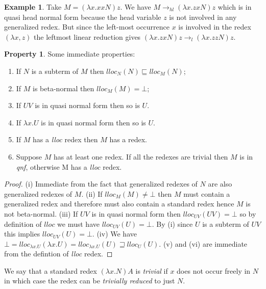 \documentclass{article}
\theoremstyle{definition}
\newtheorem{property}{Property}[section]
\newtheorem{example}{Example}[section]
\begin{document}
\begin{example}
Take $M = (\lambda x. x x N) z$. We have $M \rightarrow_{hl} (\lambda x. z x N) z$ which is in quasi head normal form because the head variable $z$ is not involved in any generalized redex.
But since the left-most occurrence $x$ is involved in the redex $(\lambda x, z)$ the leftmost linear reduction gives $(\lambda x. z x N) z \rightarrow_l (\lambda x. z z N) z$.
\end{example}

\begin{property}
\label{prop:lloc_properties}
Some immediate properties:
\begin{enumerate}[label=(\roman*)]
\item
 If $N$ is a subterm of $M$ then $lloc_N(N) \sqsubseteq lloc_M(N)$;
\item
 If $M$ is beta-normal then $lloc_M(M) = \bot$;
 \item
 If $U V$ is in quasi normal form then so is $U$.
\item
 If $\lambda x . U$ is in quasi normal form then so is $U$.
 \item If $M$ has a \emph{lloc} redex then $M$ has a redex.
 \item Suppose $M$ has at least one redex.
 If all the redexes are trivial then $M$ is in \emph{qnf}, otherwise M has a \emph{lloc} redex.
\end{enumerate}
\end{property}
\begin{proof}
(i) Immediate from the fact that generalized redexes of $N$ are also generalized redexes of $M$. (ii) If $lloc_M(M) \neq \bot$ then $M$ must contain a generalized redex and therefore must also contain a standard redex hence $M$ is not beta-normal.
(iii) If $U V$ is in quasi normal form then $lloc_{UV}(UV) = \bot$ so by definition of $lloc$ we must have $lloc_{UV}(U) = \bot$. By (i) since $U$ is a subterm of $UV$ this implies $lloc_{UV}(U) = \bot$.
(iv) We have $\bot = lloc_{\lambda x . U}(\lambda x . U) = lloc_{\lambda x . U}(U) \sqsupseteq lloc_{U}(U)$.
(v) and (vi) are immediate from the defintion of \emph{lloc} redex.
\end{proof}

We say that a standard redex $(\lambda x. N) A$ is \emph{trivial} if $x$ does not occur freely in $N$ in which case the redex can be \emph{trivially reduced} to just $N$.
\end{document}
